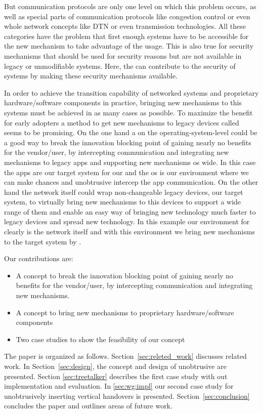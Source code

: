 But communication protocols are only one level on which this problem occurs, as well as special parts of communication protocols like congestion control or even whole network concepts like DTN or even transmission technologies. 
All these categories have the problem that first enough systems have to be accessible for the new mechanism to take advantage of the usage. 
This is also true for security mechanisms that should be used for security reasons but are not available in legacy or unmodifiable systems. 
Here, the \mm can contribute to the security of systems by making these security mechanisms available.

In order to achieve the transition capability of networked systems and proprietary hardware/software components in practice, bringing new mechanisms to this systems must be achieved in as many cases as possible. 
To maximize the benefit for early adopters a method to get new mechanisms to legacy devices called  \mm seems to be promising.
On the one hand a \mm on the operating-system-level could be a good way to break the innovation blocking point of gaining nearly no benefits for the vendor/user, by intercepting communication and integrating new mechanisms to legacy apps and supporting new mechanisms os wide.
In this case the apps are our target system for our \mm and the os is our environment where we can make chances and unobtrusive intercep the app communication.
On the other hand the network itself could wrap non-changeable legacy devices, our target system, to virtually bring new mechanisms to this devices to support a wide range of them and enable an easy way of bringing new technology much faster to legacy devices and spread new technology. 
In this example our environment for \mm clearly is the network itself and with this environment we bring new mechanisms to the target system by \mm. 


% 
% 


Our contributions are:

\begin{itemize}
 \item A concept to break the innovation blocking point of gaining nearly no benefits for the vendor/user, by intercepting communication and integrating new mechanisms.
 \item A concept to bring new mechanisms to proprietary hardware/software components
 \item Two case studies to show the feasibility of our concept 
\end{itemize}

The paper is organized as follows. 
Section~\ref{sec:releted_work} discusses related work.
In Section~\ref{sec:design}, the concept and design of unobtrusive \mm are presented.
Section \ref{sec:treetalker} describes the first case study with out \ttt implementation and evaluation. 
In \ref{sec:wg:impl} our second case study for unobtrusively inserting vertical handovers is presented. 
Section~\ref{sec:conclusion} concludes the paper and outlines areas of future work.